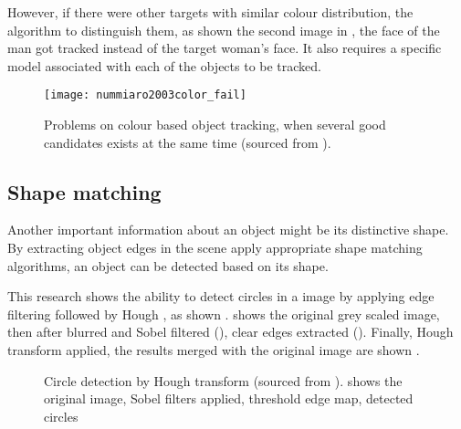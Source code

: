 However, if there were other targets with  similar colour distribution, the algorithm  to distinguish them, as shown  the second image in , the face of the man got tracked instead of the target woman's face. It also requires a specific model associated with each of the objects to be tracked.

\begin{figure}[H]
  \centering
  \texttt{[image: nummiaro2003color\_fail]}
  \caption{Problems on colour based object tracking, when several good candidates exists at the same time (sourced from \cite{nummiaro2003color}).}
  \label{Figure:nummiaro2003color_fail}
\end{figure}

\subsection{Shape matching}

Another important information about an object might be its distinctive shape. By extracting object edges in the scene  apply appropriate shape matching algorithms, an object can be detected based on its shape.

This research \cite{borovicka2003circle} shows the ability to detect circles in a image by applying edge filtering followed by Hough , as shown  .  shows the original grey scaled image, then after blurred and Sobel filtered (), clear edges  extracted (). Finally, Hough transform  applied, the results merged with the original image are shown  .

\begin{figure}[H]
  \centering
  \caption{Circle detection by Hough transform (sourced from \cite{borovicka2003circle}).  shows the original image,  Sobel filters applied,  threshold edge map,  detected circles}
  \label{Figure:bg_circles}
\end{figure}

